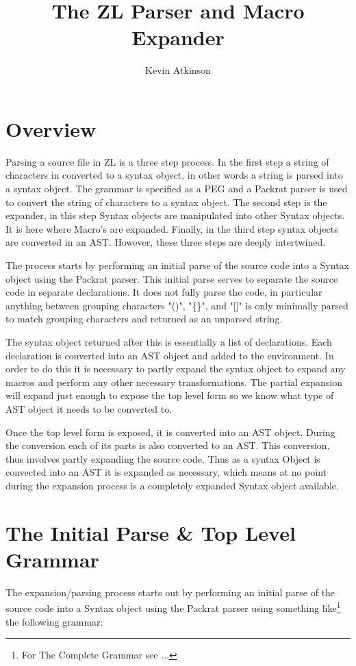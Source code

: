 \documentclass[12pt,english,letterpaper]{article}
\begin{document}
\title{The ZL Parser and Macro Expander}
\author{Kevin Atkinson}

\section{Overview}

Parsing a source file in ZL is a three step process.  In the first
step a string of characters in converted to a syntax object, in other
words a string is parsed into a syntax object.  The grammar is
specified as a PEG and a Packrat parser is used to convert the string of
characters to a syntax object.  The second step is the expander, in
this step Syntax objects are manipulated into other Syntax objects.
It is here where Macro's are expanded.  Finally, in the third step
syntax objects are converted in an AST.  However, these three steps
are deeply intertwined.

The process starts by performing an initial parse of the source code
into a Syntax object using the Packrat parser.  This initial parse
serves to separate the source code in separate declarations.  It does
not fully parse the code, in particular anything between grouping
characters "()", "\{\}", and "[]" is only minimally parsed to match
grouping characters and returned as an unparsed string.

The syntax object returned after this is essentially a list of
declarations.  Each declaration is converted into an AST object and
added to the environment.  In order to do this it is necessary to partly
expand the syntax object to expand any macros and perform any other
necessary transformations.  The partial expansion will expand just
enough to expose the top level form so we know what type of AST object
it needs to be converted to.

Once the top level form is exposed, it is converted into an AST
object.  During the conversion each of its parts is also converted to
an AST.  This conversion, thus involves partly expanding the source
code.  Thus as a syntax Object is convected into an AST it is expanded
as necessary, which means at no point during the expansion process is
a completely expanded Syntax object available.

\section{The Initial Parse \& Top Level Grammar}

The expansion/parsing process starts out by performing an initial
parse of the source code into a Syntax object using the Packrat parser
using something like\footnote{For The Complete Grammar see ...} the
following grammar:
\end{document}
